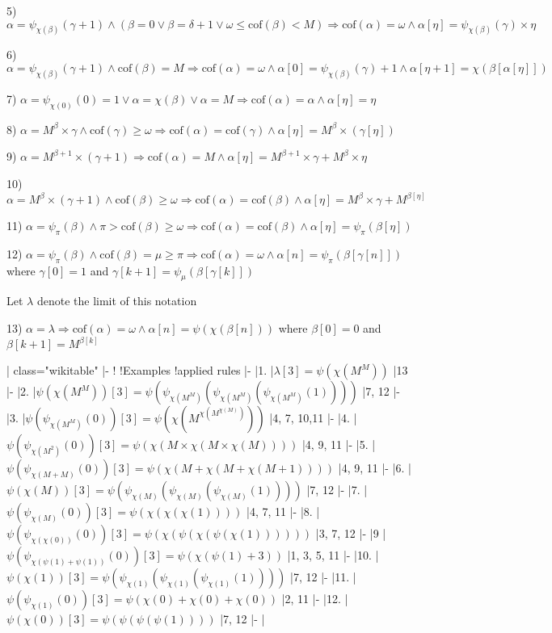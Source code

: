 \documentclass[10pt]{article}
\begin{document}
5)  \(\alpha=\psi_{\chi(\beta)}(\gamma+1)\wedge(\beta=0\vee\beta=\delta+1\vee\omega\le\text{cof}(\beta)<M)\Rightarrow\text{cof}(\alpha)=\omega\wedge\alpha[\eta]=\psi_{\chi(\beta)}(\gamma)\times \eta\)

6)  \(\alpha=\psi_{\chi(\beta)}(\gamma+1)\wedge\text{cof}(\beta)=M\Rightarrow\text{cof}(\alpha)=\omega\wedge\alpha[0]=\psi_{\chi(\beta)}(\gamma)+1\wedge\alpha[\eta+1]=\chi(\beta[\alpha[\eta]])\)

7)  \(\alpha=\psi_{\chi(0)}(0)=1\vee\alpha=\chi(\beta)\vee\alpha=M\Rightarrow\text{cof}(\alpha)=\alpha\wedge\alpha[\eta]=\eta\)

8) \(\alpha=M^{\beta}\times\gamma \wedge \text{cof} (\gamma)\geq\omega \Rightarrow \text{cof} (\alpha)= \text{cof}(\gamma)\wedge\alpha[\eta]=M^{\beta}\times(\gamma[\eta])\)

9) \(\alpha=M^{\beta+1}\times(\gamma+1) \Rightarrow \text{cof} (\alpha)=M \wedge\alpha[\eta]=M^{\beta+1}\times\gamma+M^\beta\times\eta\)

10) \(\alpha=M^\beta\times(\gamma+1) \wedge\text{cof}(\beta)\geq\omega \Rightarrow \text{cof}(\alpha)= \text{cof}(\beta) \wedge \alpha[\eta]=M^\beta\times\gamma+M^{\beta[\eta]}\)

11) \(\alpha=\psi_\pi(\beta) \wedge \pi>\text{cof}(\beta)\geq\omega \Rightarrow \text{cof} (\alpha)= \text{cof}(\beta) \wedge \alpha[\eta]=\psi_\pi(\beta[\eta])\)

12) \(\alpha=\psi_\pi(\beta) \wedge \text{cof}(\beta)=\mu\geq\pi \Rightarrow \text{cof} (\alpha)=\omega \wedge \alpha[n]=\psi _\pi(\beta[\gamma[n]])\) where  \(\gamma[0]=1\) and  \(\gamma[k+1]=\psi_\mu(\beta[\gamma[k]])\)

Let \(\lambda\) denote the limit of this notation

13) \(\alpha=\lambda\Rightarrow\text{cof} (\alpha)=\omega \wedge \alpha[n]=\psi(\chi(\beta[n]))\) where \(\beta[0]=0\) 
and \(\beta[k+1]=M^{\beta[k]}\)

\bigskip

{| class="wikitable"
|-
!
!Examples
!applied rules
|-
|1.
|\(\lambda[3]=\psi(\chi(M^M))\)
|13
|-
|2.
|\(\psi(\chi(M^M))[3]=\psi(\psi_{\chi(M^M)}(\psi_{\chi(M^M)}(\psi_{\chi(M^M)}(1))))\)
|7, 12
|-
|3.
|\(\psi(\psi_{\chi(M^M)}(0))[3]=\psi(\chi(M^{\chi(M^{\chi(M)})}))\)
|4, 7, 10,11
|-
|4.
|\(\psi(\psi_{\chi(M^2)}(0))[3]=\psi(\chi(M\times\chi(M\times\chi(M))))\)
|4, 9, 11
|-
|5.
|\(\psi(\psi_{\chi(M+M)}(0))[3]=\psi(\chi(M+\chi(M+\chi(M+1))))\)
|4, 9, 11
|-
|6.
|\(\psi(\chi(M))[3]=\psi(\psi_{\chi(M)}(\psi_{\chi(M)}(\psi_{\chi(M)}(1))))\)
|7, 12
|-
|7.
|\(\psi(\psi_{\chi(M)}(0))[3]=\psi(\chi(\chi(\chi(1))))\)
|4, 7, 11
|-
|8.
|\(\psi(\psi_{\chi(\chi(0))}(0))[3]=\psi(\chi(\psi(\chi(\psi(\chi(1))))))\)
|3, 7, 12
|-
|9
|\(\psi(\psi_{\chi(\psi(1)+\psi(1))}(0))[3]=\psi(\chi(\psi(1)+3))\)
|1, 3, 5, 11
|-
|10.
|\(\psi(\chi(1))[3]=\psi(\psi_{\chi(1)}(\psi_{\chi(1)}(\psi_{\chi(1)}(1))))\)
|7, 12
|-
|11.
|\(\psi(\psi_{\chi(1)}(0))[3]=\psi(\chi(0)+\chi(0)+\chi(0))\)
|2, 11
|-
|12.
|\(\psi(\chi(0))[3]=\psi(\psi(\psi(\psi(1))))\)
|7, 12
|-
|}
\end{document}
